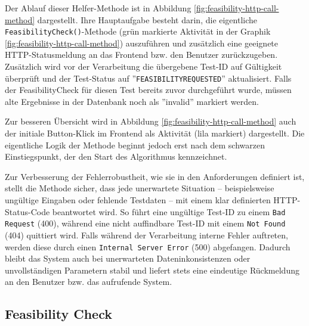 Der Ablauf dieser Helfer-Methode ist in Abbildung \ref{fig:feasibility-http-call-method} dargestellt. Ihre Hauptaufgabe besteht darin, die eigentliche \texttt{FeasibilityCheck()}-Methode (grün markierte Aktivität in der Graphik \ref{fig:feasibility-http-call-method}) auszuführen und zusätzlich eine geeignete HTTP-Statusmeldung an das Frontend bzw. den Benutzer zurückzugeben. Zusätzlich wird vor der Verarbeitung die übergebene Test-ID auf Gültigkeit überprüft und der Test-Status auf ''\texttt{FEASIBILITYREQUESTED}'' aktualisiert. Falls der FeasibilityCheck für diesen Test bereits zuvor durchgeführt wurde, müssen alte Ergebnisse in der Datenbank noch als ''invalid'' markiert werden.


Zur besseren Übersicht wird in Abbildung \ref{fig:feasibility-http-call-method} auch der initiale Button-Klick im Frontend als Aktivität (lila markiert) dargestellt. Die eigentliche Logik der Methode beginnt jedoch erst nach dem schwarzen Einstiegspunkt, der den Start des Algorithmus kennzeichnet.

Zur Verbesserung der Fehlerrobustheit, wie sie in den Anforderungen definiert ist, stellt die Methode sicher, dass jede unerwartete Situation – beispielsweise ungültige Eingaben oder fehlende Testdaten – mit einem klar definierten HTTP-Status-Code beantwortet wird. So führt eine ungültige Test-ID zu einem \texttt{Bad Request} (400), während eine nicht auffindbare Test-ID mit einem \texttt{Not Found} (404) quittiert wird. Falls während der Verarbeitung interne Fehler auftreten, werden diese durch einen \texttt{Internal Server Error} (500) abgefangen. Dadurch bleibt das System auch bei unerwarteten Dateninkonsistenzen oder unvollständigen Parametern stabil und liefert stets eine eindeutige Rückmeldung an den Benutzer bzw. das aufrufende System.

\subsection{Feasibility Check}


